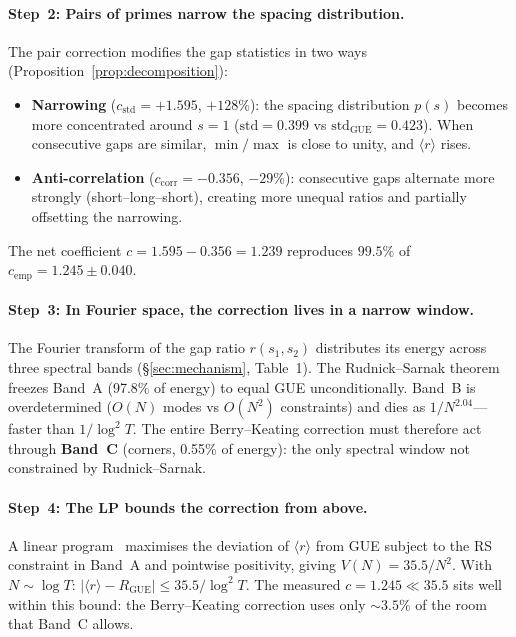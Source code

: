\documentclass[10pt]{article}
\begin{document}
\paragraph{Step~2: Pairs of primes narrow the spacing distribution.}
The pair correction modifies the gap statistics in two ways
(Proposition~\ref{prop:decomposition}):
\begin{itemize}
\item \textbf{Narrowing} ($c_{\mathrm{std}} = +1.595$, $+128\%$):
the spacing distribution $p(s)$ becomes more concentrated around $s = 1$
($\mathrm{std} = 0.399$ vs $\mathrm{std}_{\mathrm{GUE}} = 0.423$).
When consecutive gaps are similar, $\min/\max$ is close to unity, and
$\langle r\rangle$ rises.
\item \textbf{Anti-correlation} ($c_{\mathrm{corr}} = -0.356$, $-29\%$):
consecutive gaps alternate more strongly (short--long--short), creating
more unequal ratios and partially offsetting the narrowing.
\end{itemize}
The net coefficient $c = 1.595 - 0.356 = 1.239$ reproduces $99.5\%$ of
$c_{\mathrm{emp}} = 1.245 \pm 0.040$.

\paragraph{Step~3: In Fourier space, the correction lives in a narrow window.}
The Fourier transform of the gap ratio $r(s_1, s_2)$ distributes its energy
across three spectral bands (\S\ref{sec:mechanism}, Table~1). The
Rudnick--Sarnak theorem~\cite{rudnick1996} freezes Band~A (97.8\% of
energy) to equal GUE unconditionally. Band~B is overdetermined
($O(N)$ modes vs $O(N^2)$ constraints) and dies as $1/N^{2.04}$---faster
than $1/\log^2 T$. The entire Berry--Keating correction must therefore
act through \textbf{Band~C} (corners, 0.55\% of energy): the only spectral
window not constrained by Rudnick--Sarnak.

\paragraph{Step~4: The LP bounds the correction from above.}
A linear program~\cite{alarcon2026e} maximises the deviation of
$\langle r\rangle$ from GUE subject to the RS constraint in Band~A and
pointwise positivity, giving $V(N) = 35.5/N^2$. With $N \sim \log T$:
$|\langle r\rangle - R_{\mathrm{GUE}}| \leq 35.5/\log^2 T$. The measured
$c = 1.245 \ll 35.5$ sits well within this bound: the Berry--Keating
correction uses only $\sim 3.5\%$ of the room that Band~C allows.
\end{document}
